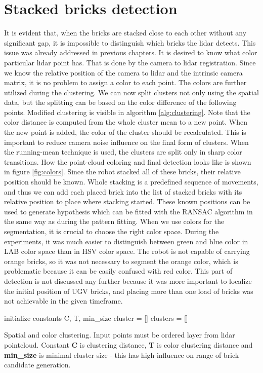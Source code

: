 \section{Stacked bricks detection}
It is evident that, when the bricks are stacked close to each other without any significant gap, it is impossible to distinguish which bricks the lidar detects. This issue was already addressed in previous chapters. It is desired to know what color particular lidar point has. That is done by the camera to lidar registration. Since we know the relative position of the camera to lidar and the intrinsic camera matrix, it is no problem to assign a color to each point. The colors are further utilized during the clustering. We can now split clusters not only using the spatial data, but the splitting can be based on the color difference of the following points. Modified clustering is visible in algorithm \ref{alg:clustering}. Note that the color distance is computed from the whole cluster mean to a new point. When the new point is added, the color of the cluster should be recalculated. This is important to reduce camera noise influence on the final form of clusters. When the running-mean technique is used, the clusters are split only in sharp color transitions. How the point-cloud coloring and final detection looks like is shown in figure  \ref{fig:colors}. Since the robot stacked all of these bricks, their relative position should be known. Whole stacking is a predefined sequence of movements, and thus we can add each placed brick into the list of stacked bricks with its relative position to place where stacking started. These known positions can be used to generate hypothesis which can be fitted with the RANSAC algorithm in the same way as during the pattern fitting. When we use colors for the segmentation, it is crucial to choose the right color space. During the experiments, it was much easier to distinguish between green and blue color in LAB color space than in HSV color space. The robot is not capable of carrying orange bricks, so it was not necessary to segment the orange color, which is problematic because it can be easily confused with red color. This part of detection is not discussed any further because it was more important to localize the initial position of UGV bricks, and placing more than one load of bricks was not achievable in the given timeframe.

\begin{algorithm}[H]
	initialize constants C, T, min\_size \;
	cluster = []\;
	clusters = []\;
	\caption{Spatial and color clustering. Input points must be ordered layer from lidar pointcloud. Constant \textbf{C} is clustering distance, \textbf{T} is color clustering distance and \textbf{min\_size} is minimal cluster size - this has high influence on range of brick candidate generation.}
	\label{alg:clustering}
\end{algorithm}

